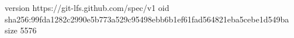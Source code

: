 version https://git-lfs.github.com/spec/v1
oid sha256:99fda1282c2990e5b773a529c95498ebb6b1ef61fad564821eba5cebe1d549ba
size 5576
